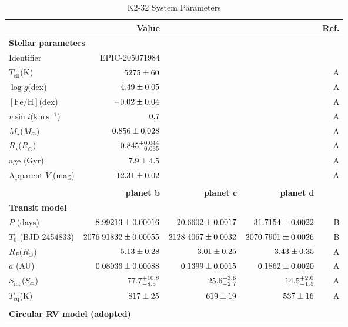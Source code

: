\documentclass[preprint2]{aastex6}
\newcommand{\Mstar}{\ensuremath{M_{\star}}\xspace}
\newcommand{\Rstar}{\ensuremath{R_{\star}}\xspace}
\newcommand{\fe}{\ensuremath{\mathrm{[Fe/H]}}\xspace}
\newcommand{\teff}{$T_{\mathrm{eff}}$\xspace}
\newcommand{\logg}{\ensuremath{\log g}\xspace}
\newcommand{\vsini}{\ensuremath{v \sin i}\xspace}
\newcommand{\Rp}{\ensuremath{R_P}\xspace}
\newcommand{\Teq}{$T_{\mathrm{eq}}$\xspace}
\newcommand{\Sinc}{\ensuremath{S_{\mathrm{inc}}}\xspace}
\newcommand{\kms}{\ensuremath{\mathrm{km}\,\mathrm{s}^{-1}}\xspace}
\newcommand{\Se}{\ensuremath{S_{\oplus}}\xspace}
\renewcommand{\Re}{\ensuremath{R_{\oplus}}\xspace}
\newcommand{\Rsun}{\ensuremath{R_{\odot}}\xspace }
\newcommand{\Msun}{\ensuremath{M_{\odot}}\xspace}
\begin{document}
{\renewcommand{\arraystretch}{0.9}
\begin{table*}[htbp!]
\centering
\caption{K2-32 System Parameters}
\begin{tabular}{lrrrr}
\hline
\hline
 & Value  & & & Ref.  \\
\hline
    \multicolumn{5}{l}{{\bf Stellar parameters}} \\
    Identifier         & EPIC-205071984             &  & &   \\
    \teff (K)          & $\val{K2-32-star}{teff}$   &  & & A \\
    \logg (dex)        & $\val{K2-32-star}{logg}$   &  & & A \\
    \fe (dex)          & $\val{K2-32-star}{fe}$     &  & & A \\
    \vsini (\kms)      & $\val{K2-32-star}{vsini}$  &  & & A \\
    \Mstar (\Msun)     & $\val{K2-32-star}{mass}$   &  & & A \\
    \Rstar (\Rsun)     & $\val{K2-32-star}{radius}$ &  & & A \\
    age (Gyr)          & $\val{K2-32-star}{agegyr}$ &  & & A \\
    Apparent $V$ (mag) & $\val{K2-32-star}{vmag}$   &  & & A \\
        \\[-2ex]
    {}                  & {\bf planet b} & {\bf planet c} & {\bf planet d} &  \\ 
    \multicolumn{5}{l}{{\bf Transit model}} \\
    $P$ (days)          & $\val{K2-32-circ}{P1}$    & $\val{K2-32-circ}{P2}$     & $\val{K2-32-circ}{P3}$      & B\\
    $T_0$ (BJD-2454833) & $\val{K2-32-circ}{T01}$   & $\val{K2-32-circ}{T02}$    & $\val{K2-32-circ}{T03}$     & B\\
    \Rp (\Re)           & $\val{K2-32-circ}{Rp1}$   & $\val{K2-32-circ}{Rp2}$    & $\val{K2-32-circ}{Rp3}$     & A\\
    $a$ (AU)            & $\val{K2-32-circ}{a1}$    & $\val{K2-32-circ}{a2}$     & $\val{K2-32-circ}{a3}$      & A\\
    \Sinc (\Se)         & $\val{K2-32-circ}{Sinc1}$ & $\val{K2-32-circ}{Sinc2}$  & $\val{K2-32-circ}{Sinc3}$   & A\\
    \Teq (K)            & $\val{K2-32-circ}{Teq1}$  & $\val{K2-32-circ}{Teq2}$   & $\val{K2-32-circ}{Teq3}$    & A\\
        \\[-2ex]
    \multicolumn{5}{l}{{\bf Circular RV model (adopted)}} \\

\end{tabular}
\end{table*}}
\end{document}
